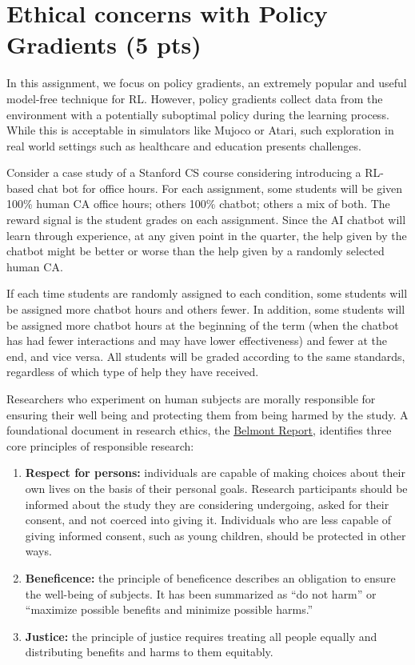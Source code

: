 \documentclass{article}
\begin{document}
\newpage
\section{Ethical concerns with Policy Gradients (5 pts)}
In this assignment, we focus on policy gradients, an extremely popular and useful model-free technique for RL. However, policy gradients collect data from the environment with a potentially suboptimal policy during the learning process. While this is acceptable in simulators like Mujoco or Atari, such exploration in real world settings such as healthcare and education presents challenges. 

Consider a case study of a Stanford CS course considering introducing a RL-based chat bot for office hours.  For each assignment, some students will be given 100\% human CA office hours; others 100\% chatbot; others a mix of both. The reward signal is the student grades on each assignment. Since the AI chatbot will learn through experience, at any given point in the quarter, the help given by the chatbot might be better or worse than the help given by a randomly selected human CA.  

If each time students are randomly assigned to each condition, some students will be assigned more chatbot hours and others fewer. In addition, some students will be assigned more chatbot hours at the beginning of the term (when the chatbot has had fewer interactions and may have lower effectiveness)  and fewer at the end, and vice versa.  All students will be graded according to the same standards, regardless of which type of help they have received.  

Researchers who experiment on human subjects are morally responsible for ensuring their well being and protecting them from being harmed by the study. A foundational document in research ethics, the \href{https://www.hhs.gov/ohrp/regulations-and-policy/belmont-report/read-the-belmont-report/index.html#xethical}{Belmont Report}, identifies three core principles of responsible research:

\begin{enumerate}
    \item \textbf{Respect for persons:} individuals are capable of making choices about their own lives on the basis of their personal goals. Research participants should be informed about the study they are considering undergoing, asked for their consent, and not coerced into giving it. Individuals who are less capable of giving informed consent, such as young children, should be protected in other ways.

    \item \textbf{Beneficence:} the principle of beneficence describes an obligation to ensure the well-being of subjects. It has been summarized as “do not harm” or “maximize possible benefits and minimize possible harms.”
    \item \textbf{Justice:} the principle of justice requires treating all people equally and distributing benefits and harms to them equitably. 
    
\end{enumerate}
\end{document}
